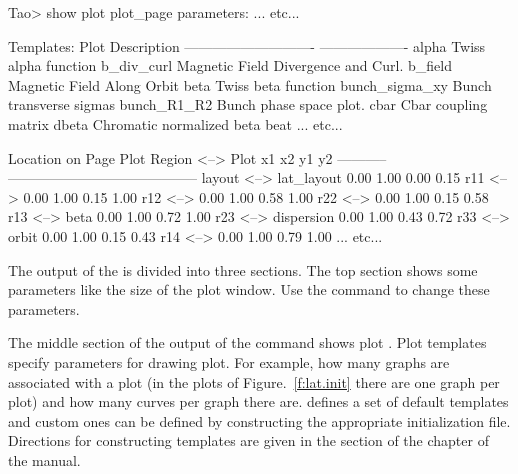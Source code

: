 \documentclass{hitec}
\begin{document}
{\small
\begin{code}
Tao> show plot
plot_page parameters:
... etc...

Templates:
   Plot                                    Description
   ----------------------------            -------------------
   alpha                                   Twiss alpha function
   b_div_curl                              Magnetic Field Divergence and Curl.
   b_field                                 Magnetic Field Along Orbit
   beta                                    Twiss beta function
   bunch_sigma_xy                          Bunch transverse sigmas
   bunch_R1_R2                             Bunch phase space plot.
   cbar                                    Cbar coupling matrix
   dbeta                                   Chromatic normalized beta beat
... etc...

                                               Location on Page
Plot Region         <-->  Plot                 x1    x2    y1    y2
-----------               -----------------------------------------
layout              <-->  lat_layout          0.00  1.00  0.00  0.15
r11                 <-->                      0.00  1.00  0.15  1.00
r12                 <-->                      0.00  1.00  0.58  1.00
r22                 <-->                      0.00  1.00  0.15  0.58
r13                 <-->  beta                0.00  1.00  0.72  1.00
r23                 <-->  dispersion          0.00  1.00  0.43  0.72
r33                 <-->  orbit               0.00  1.00  0.15  0.43
r14                 <-->                      0.00  1.00  0.79  1.00
... etc...
\end{code}}
The output of the  is divided into three sections. The top section
shows some parameters like the size of the plot window. Use the 
command to change these parameters. 

The middle section of the output of the  command shows plot .
Plot templates specify parameters for drawing plot. For example, how many graphs are
associated with a plot (in the plots of Figure.~\ref{f:lat.init} there are one graph per plot)
and how many curves per graph there are. \tao defines a set of default templates and custom
ones can be defined by constructing the appropriate initialization file. Directions for
constructing templates are given in the  section of the  chapter of the \tao manual.
\end{document}
